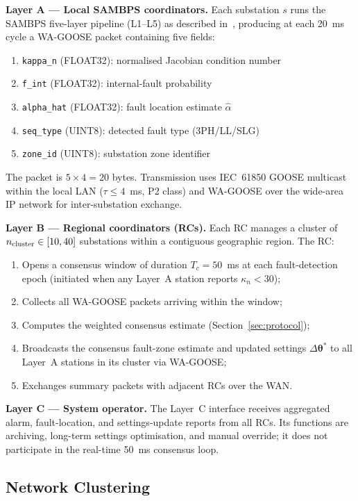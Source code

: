 \documentclass[journal]{IEEEtran}
\newcommand{\kappan}{\kappa_n}
\newcommand{\Tc}{T_c}
\begin{document}
\textbf{Layer A — Local SAMBPS coordinators.}
Each substation $s$ runs the SAMBPS five-layer pipeline (L1--L5) as
described in~\cite{SAMBP_TR65}, producing at each 20~ms cycle a
WA-GOOSE packet containing five fields:
\begin{enumerate}
  \item \texttt{kappa\_n} (FLOAT32): normalised Jacobian condition number
  \item \texttt{f\_int} (FLOAT32): internal-fault probability
  \item \texttt{alpha\_hat} (FLOAT32): fault location estimate $\hat{\alpha}$
  \item \texttt{seq\_type} (UINT8): detected fault type (3PH/LL/SLG)
  \item \texttt{zone\_id} (UINT8): substation zone identifier
\end{enumerate}
The packet is $5 \times 4 = 20$ bytes.  Transmission uses IEC~61850
GOOSE multicast within the local LAN ($\tau \leq 4$~ms, P2 class) and
WA-GOOSE over the wide-area IP network for inter-substation exchange.

\textbf{Layer B — Regional coordinators (RCs).}
Each RC manages a cluster of $n_{\rm cluster} \in [10, 40]$ substations
within a contiguous geographic region.  The RC:
\begin{enumerate}
  \item Opens a consensus window of duration $\Tc = 50$~ms at each
        fault-detection epoch (initiated when any Layer~A station reports
        $\kappan < 30$);
  \item Collects all WA-GOOSE packets arriving within the window;
  \item Computes the weighted consensus estimate
        (Section~\ref{sec:protocol});
  \item Broadcasts the consensus fault-zone estimate and updated settings
        $\Delta\bm{\theta}^\ast$ to all Layer~A stations in its cluster
        via WA-GOOSE;
  \item Exchanges summary packets with adjacent RCs over the WAN.
\end{enumerate}

\textbf{Layer C — System operator.}
The Layer~C interface receives aggregated alarm, fault-location, and
settings-update reports from all RCs.  Its functions are archiving,
long-term settings optimisation, and manual override; it does not
participate in the real-time 50~ms consensus loop.

\subsection{Network Clustering}
\end{document}

